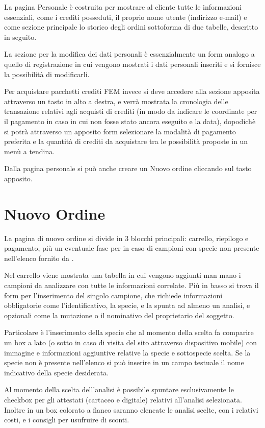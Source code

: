 La pagina Personale è costruita per mostrare al cliente tutte le informazioni essenziali, come i crediti posseduti, il proprio nome utente (indirizzo e-mail) e come sezione principale lo storico degli ordini sottoforma di due tabelle, descritto in seguito.

La sezione per la modifica dei dati personali è essenzialmente un form analogo a quello di registrazione in cui vengono mostrati i dati personali inseriti e si fornisce la possibilità di modificarli.

Per acquistare pacchetti crediti FEM invece si deve accedere alla sezione apposita attraverso un tasto in alto a destra, e verrà mostrata la cronologia delle transazione relativi agli acquisti di crediti (in modo da indicare le coordinate per il pagamento in caso in cui non fosse stato ancora eseguito e la data), dopodichè si potrà attraverso un apposito form selezionare la modalità di pagamento preferita e la quantità di crediti da acquistare tra le possibilità proposte in un menù a tendina.

Dalla pagina personale si può anche creare un \textsf{Nuovo ordine} cliccando sul tasto apposito.

\section*{Nuovo Ordine}
La pagina di nuovo ordine si divide in 3 blocchi principali: \textsf{carrello}, \textsf{riepilogo} e \textsf{pagamento}, più un eventuale fase per in caso di campioni con specie non presente nell'elenco fornito da {\fem}.

Nel \textsf{carrello} viene mostrata una tabella in cui vengono aggiunti man mano i campioni da analizzare con tutte le informazioni correlate. Più in basso si trova il form per l'inserimento del singolo campione, che richiede informazioni obbligatorie come l'identificativo, la specie, e la spunta ad almeno un analisi, e opzionali come la mutazione o il nominativo del proprietario del soggetto.

Particolare è l'inserimento della specie che al momento della scelta fa comparire un box a lato (o sotto in caso di visita del sito attraverso dispositivo mobile) con immagine e informazioni aggiuntive relative la specie e sottospecie scelta. Se la specie non è presente nell'elenco si può inserire in un campo testuale il nome indicativo della specie desiderata.

Al momento della scelta dell'analisi è possibile spuntare esclusivamente le checkbox per gli attestati (cartaceo e digitale) relativi all'analisi selezionata. Inoltre in un box colorato a fianco saranno elencate le analisi scelte, con i relativi costi, e i consigli per usufruire di sconti.

